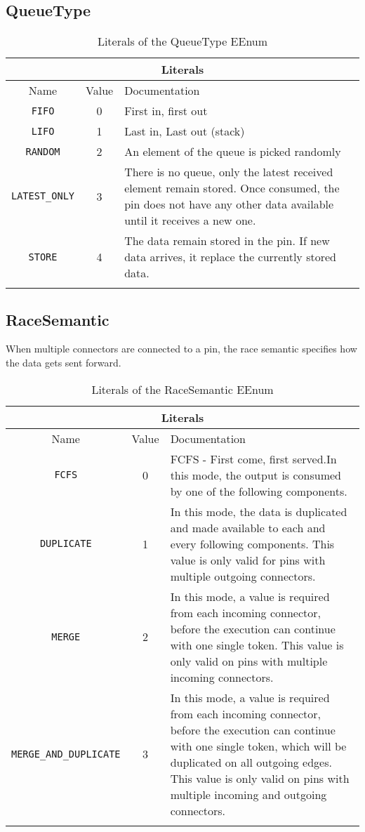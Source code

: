 \documentclass{article}
\begin{document}
\subsection[QueueType]{QueueType}
\label{e4smQueueType}

\begin{table}[H]
\footnotesize
\begin{tabularx}{\textwidth}{| c | c | X |}
\hline
\multicolumn{3}{|c|}{\textbf{Literals}} \\
\hline
Name & Value & Documentation \\ \hline \hline
\texttt{FIFO} & 0 &
First in, first out \\ \hline
\texttt{LIFO} & 1 &
Last in, Last out (stack) \\ \hline
\texttt{RANDOM} & 2 &
An element of the queue is picked randomly \\ \hline
\texttt{LATEST\_ONLY} & 3 &
There is no queue, only the latest received element remain stored. Once consumed, the pin does not have any other data available until it receives a new one. \\ \hline
\texttt{STORE} & 4 &
The data remain stored in the pin. If new data arrives, it replace the currently stored data. \\ \hline
\caption{Literals of the QueueType EEnum}
\end{tabularx}
\label{e4smQueueTypelit}
\end{table}
\subsection[RaceSemantic]{RaceSemantic}
\label{e4smRaceSemantic}

When multiple connectors are connected to a pin, the race semantic specifies how the data gets sent forward.
\begin{table}[H]
\footnotesize
\begin{tabularx}{\textwidth}{| c | c | X |}
\hline
\multicolumn{3}{|c|}{\textbf{Literals}} \\
\hline
Name & Value & Documentation \\ \hline \hline
\texttt{FCFS} & 0 &
FCFS - First come, first served.In this mode, the output is consumed by one of the following components. \\ \hline
\texttt{DUPLICATE} & 1 &
In this mode, the data is duplicated and made available to each and every following components. This value is only valid for pins with multiple outgoing connectors. \\ \hline
\texttt{MERGE} & 2 &
In this mode, a value is required from each incoming connector, before the execution can continue with one single token. This value is only valid on pins with multiple incoming connectors. \\ \hline
\texttt{MERGE\_AND\_DUPLICATE} & 3 &
In this mode, a value is required from each incoming connector, before the execution can continue with one single token, which will be duplicated on all outgoing edges. This value is only valid on pins with multiple incoming and outgoing connectors. \\ \hline
\caption{Literals of the RaceSemantic EEnum}
\end{tabularx}
\label{e4smRaceSemanticlit}
\end{table}
\end{document}
